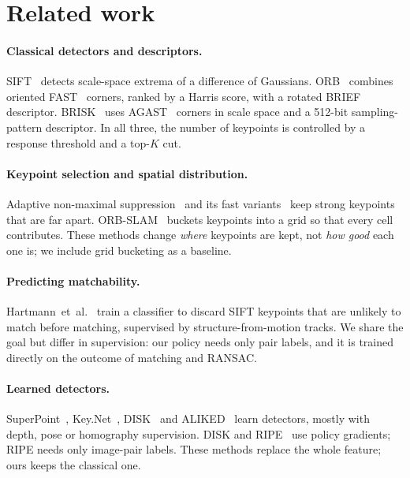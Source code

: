 \documentclass[10pt,twocolumn,letterpaper]{article}
\newcommand{\etal}{et~al.}
\begin{document}
\section{Related work}
\label{sec:related}

\paragraph{Classical detectors and descriptors.}
SIFT~\cite{lowe2004sift} detects scale-space extrema of a difference of Gaussians. ORB~\cite{rublee2011orb}
combines oriented FAST~\cite{rosten2006fast} corners, ranked by a Harris score, with a rotated BRIEF
descriptor. BRISK~\cite{leutenegger2011brisk} uses AGAST~\cite{mair2010agast} corners in scale space and
a 512-bit sampling-pattern descriptor. In all three, the number of keypoints is controlled by a
response threshold and a top-$K$ cut.

\paragraph{Keypoint selection and spatial distribution.}
Adaptive non-maximal suppression~\cite{brown2005anms} and its fast variants~\cite{bailo2018ssc} keep
strong keypoints that are far apart. ORB-SLAM~\cite{murartal2015orbslam} buckets keypoints into a grid
so that every cell contributes. These methods change \emph{where} keypoints are kept, not \emph{how
good} each one is; we include grid bucketing as a baseline.

\paragraph{Predicting matchability.}
Hartmann~\etal~\cite{hartmann2014matchability} train a classifier to discard SIFT keypoints that are
unlikely to match before matching, supervised by structure-from-motion tracks. We share the goal but
differ in supervision: our policy needs only pair labels, and it is trained directly on the outcome of
matching and RANSAC.

\paragraph{Learned detectors.}
SuperPoint~\cite{detone2018superpoint}, Key.Net~\cite{barroso2019keynet},
DISK~\cite{tyszkiewicz2020disk} and ALIKED~\cite{zhao2023aliked} learn detectors, mostly with depth,
pose or homography supervision. DISK and RIPE~\cite{kunzel2025ripe} use policy gradients; RIPE needs only
image-pair labels. These methods replace the whole feature; ours keeps the classical one.
\end{document}
